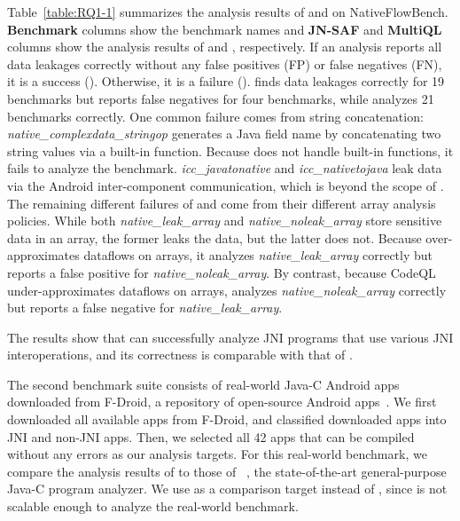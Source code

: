 Table~\ref{table:RQ1-1} summarizes the analysis
results of \jnsaf and \ours on NativeFlowBench.
{\bf Benchmark} columns show the benchmark names
and {\bf JN-SAF} and {\bf MultiQL} columns show 
the analysis results of \jnsaf and \ours, respectively.
If an analysis reports all data leakages correctly without any
false positives (FP) or false negatives (FN), it is a success (\cmark).
Otherwise, it is a failure (\xmark).
\ours finds data leakages correctly for 19 benchmarks but reports false
negatives for four benchmarks, while \jnsaf analyzes 21 benchmarks correctly. 
One common failure comes from string concatenation:
{\it native\_complexdata\_stringop} generates a Java field name by
concatenating two string values via a built-in function.
Because \ours does not handle built-in functions, it fails to analyze the benchmark.
{\it icc\_javatonative} and {\it icc\_nativetojava} leak data via the Android
inter-component communication, which is beyond the scope of \ours.
The remaining different failures of \ours and \jnsaf come from
their different array analysis policies.
While both {\it native\_leak\_array} and {\it native\_noleak\_array} store sensitive data in an array,
the former leaks the data, but the latter does not.
Because \jnsaf over-approximates dataflows on arrays,
it analyzes {\it native\_leak\_array} correctly but reports a false positive for {\it native\_noleak\_array}.
By contrast, because CodeQL under-approximates dataflows on arrays,
\ours analyzes {\it native\_noleak\_array} correctly but reports a false negative for
{\it native\_leak\_array}.

The results show that \ours can successfully analyze JNI programs that
use various JNI interoperations, and its correctness is comparable with that of \jnsaf.

The second benchmark suite consists of real-world Java-C Android apps downloaded from
F-Droid, a repository of open-source Android apps~\cite{fdroid}.  We first
downloaded all available apps from F-Droid, and classified downloaded apps into JNI and non-JNI apps.
Then, we selected all 42 apps that can be compiled without any errors as our analysis targets.
For this real-world benchmark, we compare the analysis results of
\ours to those of \lees~\cite{LeeASE20},
the state-of-the-art general-purpose Java-C program analyzer.
We use \lees as a comparison target instead of \jnsaf,
since \jnsaf is not scalable enough to analyze the real-world benchmark.



